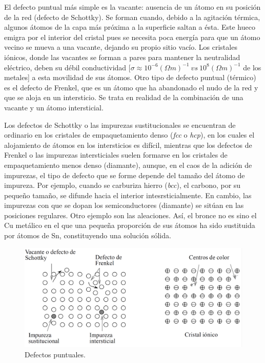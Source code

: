 El defecto puntual más simple es la vacante: ausencia de un átomo en su posición de la red (defecto de Schottky). Se forman cuando, debido a la agitación térmica, algunos átomos de la capa más próxima a la superficie saltan a ésta. Este hueco emigra por el interior del cristal pues se necesita poca energía para que un átomo vecino se mueva a una vacante, dejando su propio sitio vacío. Los cristales iónicos, donde las vacantes se forman a pares para mantener la neutralidad eléctrico, deben su débil conductividad $[ \sigma \approx 10^{-6} (\Omega m)^{-1} \ vs \ 10^8 (\Omega m)^{-1}$ de los metales] a esta movilidad de sus  átomos. Otro tipo de defecto puntual (térmico) es el defecto de Frenkel, que es un átomo que ha abandonado el nudo de la red y que se aloja en un intersticio. Se trata en realidad de la combinación de una vacante y un átomo intersticial. %

Los defectos de Schottky o las impurezas sustitucionales se encuentran de ordinario en los cristales de empaquetamiento denso ({\it fcc} o {\it hcp}), en los cuales el alojamiento de átomos en los intersticios es difícil, mientras que los defectos de Frenkel o las impurezas intersticiales suelen formarse en los cristales de empaquetamiento menos denso (diamante), aunque, en el caos de la adición de impurezas, el tipo de defecto que se forme depende del tamaño del átomo de impureza. Por ejemplo, cuando se carburiza hierro ({\it bcc}), el carbono, por su pequeño tamaño, se difunde hacia el interior intesrsticialmente. En cambio, las impurezas con que se dopan los semiconductores (diamante) se sitúan en las posiciones regulares. Otro ejemplo son las aleaciones. Así, el bronce no es sino el Cu metálico en el que una pequeña proporción de sus átomos ha sido sustituida por átomos de Sn, constituyendo una solución sólida. 

\begin{figure}[h!] \centering
    \includegraphics[scale=0.32]{Cuerpo/Ch_01/defectos.png}
    \caption{Defectos puntuales.}
\end{figure}


